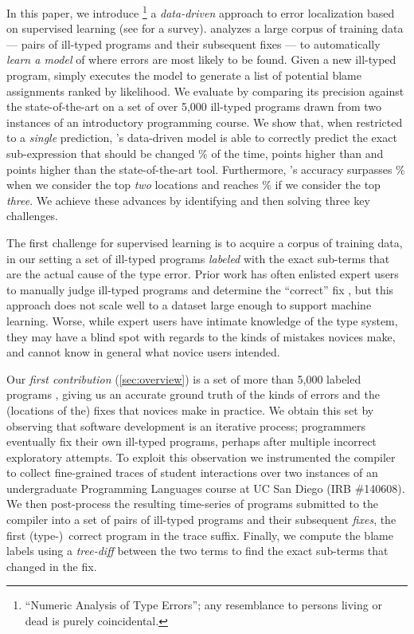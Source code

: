 %
In this paper, we introduce \toolname
\footnote{``Numeric Analysis of Type Errors''; any resemblance to persons living or dead is purely coincidental.}
a \emph{data-driven} approach to error
localization based on supervised
learning (see \citealt{Kotsiantis2007-pj} for a survey).
%
\toolname analyzes a large corpus
of training data --- pairs of ill-typed
programs and their subsequent fixes ---
to automatically \emph{learn a model}
of where errors are most likely to
be found.
%
Given a new ill-typed program,
\toolname simply executes the model
to generate a list of potential
blame assignments ranked by likelihood.
%
We evaluate \toolname by comparing its
precision against the state-of-the-art
on a set of over 5,000 ill-typed \ocaml
programs drawn from two instances of an
introductory programming course.
%
We show that, when restricted to a
\emph{single} prediction, \toolname's data-driven
model is able to correctly predict
the exact sub-expression that should
be changed \HiddenFhTopOne\% of the time,
\ToolnameWinOcaml points higher than \ocaml and
\ToolnameWinSherrloc points higher than the state-of-the-art
\sherrloc tool.
%
Furthermore, \toolname's accuracy surpasses
\HiddenFhTopTwo\% when we consider the top \emph{two}
locations and reaches \HiddenFhTopThree\% if we consider
the top \emph{three}.
%
We achieve these advances by identifying
and then solving three key challenges.

%
The first challenge for supervised learning
is to acquire a corpus of training data, in our setting
a set of ill-typed programs \emph{labeled}
with the exact sub-terms that are the actual
cause of the type error.
%
Prior work has often enlisted expert users
to manually judge ill-typed programs and
determine the ``correct'' fix
\citep[\eg][]{Lerner2007-dt,Loncaric2016-uk},
but this approach does not scale well to
a dataset large enough to support machine
learning.
%
Worse, while expert users have intimate
knowledge of the type system, they may
have a blind spot with regards to the
kinds of mistakes novices make, and
cannot know in general what novice users
intended.

Our \emph{first contribution} (\autoref{sec:overview})
is a set of more than 5,000 labeled programs \citep{Seidel2017-ko},
giving us an accurate ground truth of
the kinds of errors and the (locations
of the) fixes that novices make in
practice.
%
We obtain this set by observing that
software development is an iterative
process; programmers eventually
fix their own ill-typed programs,
perhaps after multiple incorrect
exploratory attempts.
%
To exploit this observation we instrumented
the \ocaml compiler to collect fine-grained
traces of student interactions over two instances
of an undergraduate Programming Languages
course at UC San Diego (IRB \#140608).
%
We then post-process the resulting time-series
of programs submitted to the \ocaml compiler into
a set of pairs of ill-typed programs and their
subsequent \emph{fixes}, the first (type-)~correct
program in the trace suffix.
%
Finally, we compute the blame labels using a
\emph{tree-diff} between the two terms to find
the exact sub-terms that changed in the fix.

